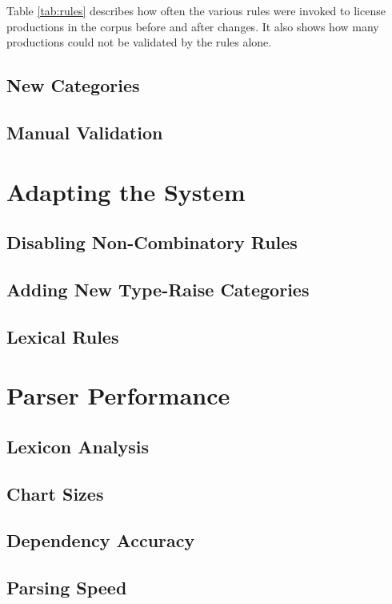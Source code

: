 Table \ref{tab:rules} describes how often the various rules were invoked to license productions in the corpus before and after changes. It also shows how many productions could not be validated by the rules alone.

\subsection{New Categories}

\subsection{Manual Validation}

\section{Adapting the \candc System}

\subsection{Disabling Non-Combinatory Rules}

\subsection{Adding New Type-Raise Categories}

\subsection{Lexical Rules}

\section{Parser Performance}

\subsection{Lexicon Analysis}

\subsection{Chart Sizes}

\subsection{Dependency Accuracy}

\subsection{Parsing Speed}

